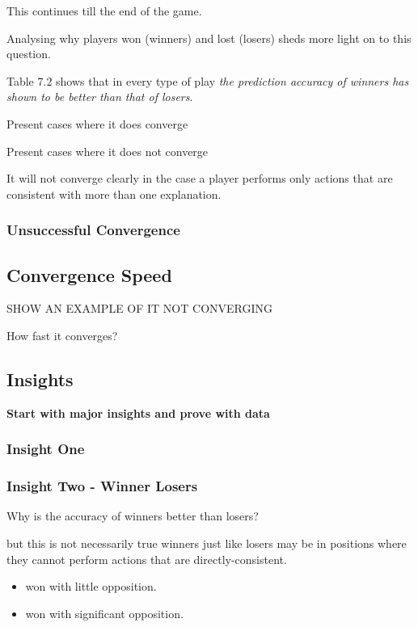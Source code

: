\documentclass[parskip]{cs4rep}
\begin{document}
This continues till the end of the game.

Analysing why players won (winners) and lost (losers) sheds more light on to this question. 
 
Table 7.2 shows that in every type of play \textit{the prediction accuracy of winners has shown to be better than that of losers}.

Present cases where it does converge

Present cases where it does not converge

It will not converge clearly in the case a player performs only actions that are consistent with more than one explanation.

\subsubsection{Unsuccessful Convergence}


\subsection{Convergence Speed}

SHOW AN EXAMPLE OF IT NOT CONVERGING

How fast it converges?

\subsection{Insights}

\textbf{Start with major insights and prove with data}

\subsubsection{Insight One}

\subsubsection{Insight Two - Winner Losers}

Why is the accuracy of winners better than losers?



but this is not necessarily true winners just like losers may be in positions where they cannot perform actions that are directly-consistent.

\begin{itemize}
\item
won with little opposition.
\item
won with significant opposition.
\end{itemize}
\end{document}
